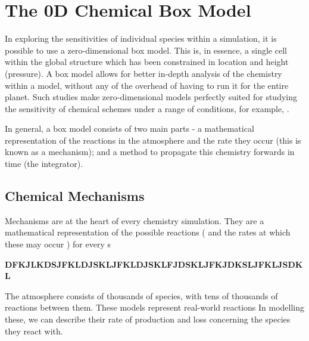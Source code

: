 \section{The 0D Chemical Box Model}
In exploring the sensitivities of individual species within a simulation, it is possible to use a zero-dimensional box model. This is, in essence, a single cell within the global structure which has been constrained in location and height (pressure). A box model allows for better in-depth analysis of the chemistry within a model, without any of the overhead of having to run it for the entire planet. Such studies make zero-dimensional models perfectly suited for studying the sensitivity of chemical schemes under a range of conditions, for example, \citep{dsmacc}.

In general, a box model consists of two main parts - a mathematical representation of the reactions in the atmosphere and the rate they occur (this is known as a mechanism); and a method to propagate this chemistry forwards in time (the integrator). 

% 



\subsection{Chemical Mechanisms}
Mechanisms are at the heart of every chemistry simulation. They are a mathematical representation of the possible reactions ( and the rates at which these may occur ) for every s


\textbf{DFKJLKDSJFKLDJSKLJFKLDJSKLFJDSKLJFKJDKSLJFKLJSDKL}

The atmosphere consists of thousands of species, with tens of thousands of reactions between them.
These models represent real-world reactions
In modelling these, we can describe their rate of production and loss concerning the species they react with.


